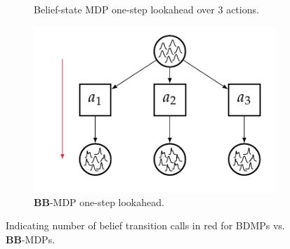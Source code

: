 \begin{figure}[b!]
    \centering
    \begin{subfigure}[t]{0.64\linewidth}
        \centering
        \caption{Belief-state MDP one-step lookahead over $3$ actions.}
        \label{fig:osl_bmdp}
    \end{subfigure}
    \hfill
    \begin{subfigure}[t]{0.32\linewidth}
        \centering
        \includegraphics[width=\linewidth]{diagrams/ivae/onestep-lookahead-bbmdp.pdf}
        \caption{\textbf{BB}-MDP one-step lookahead.}
        \label{fig:osl_bbmdp}
    \end{subfigure}
    \caption{Indicating number of belief transition calls in red for BDMPs vs. \textbf{BB}-MDPs.}
    \label{fig:onestep_lookahead}
\end{figure}


